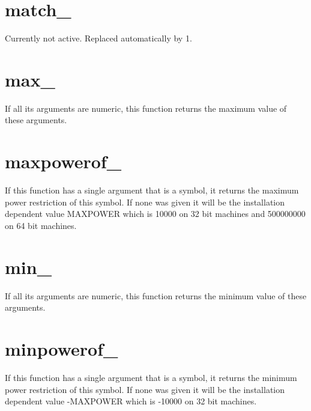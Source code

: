 
\section{match\_}
\label{funmatch}
\noindent Currently not active. Replaced automatically by 1.


\section{max\_}
\label{funmax}
\noindent If all its arguments are numeric, this function returns 
the maximum value of these arguments.


\section{maxpowerof\_}
\label{funmaxpowerof}
\noindent If this function has a single argument that is a symbol, it 
returns the maximum power restriction of this symbol. If none was given it 
will be the installation dependent value MAXPOWER which is 10000 on 
32 bit machines and 500000000 on 64 bit 
machines.


\section{min\_}
\label{funmin}
\noindent If all its arguments are numeric, this function returns 
the minimum value of these arguments.


\section{minpowerof\_}
\label{funminpowerof}
\noindent If this function has a single argument that is a symbol, it 
returns the minimum power restriction of this symbol. If none was given it 
will be the installation dependent value -MAXPOWER which is -10000 on 32 bit 
machines.


